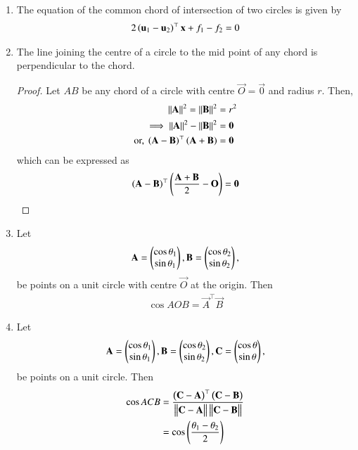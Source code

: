 \begin{enumerate}[label=\thesubsection.\arabic*.,ref=\thesubsection.\theenumi]
\item The equation of the common chord of intersection of two  circles is given by 
\begin{align}
	2\left(\mathbf{u}_1
	   -\mathbf{u}_2\right)^{\top}\mathbf{x} + f_1 - f_2 = 0
	\label{eq:circ-chord}
\end{align}
\item The line joining the centre of a circle to the mid point of any chord is perpendicular to the chord.
	\label{prop:circ-chord-perp}
	\begin{proof}
	Let $AB$ be any chord of a circle with centre $\vec{O}= \vec{0}$ and radius $r$.  Then, 
\begin{align}
	\left\lVert\mathbf{A}\right\rVert^2 
	=\left\lVert\mathbf{B}\right\rVert^2  &= r^2
	\\
	\implies 
	\left\lVert\mathbf{A}\right\rVert^2 
	-\left\lVert\mathbf{B}\right\rVert^2  &=\mathbf{0}
	\\
	\text{or, }\left(\mathbf{A}-\mathbf{B}\right)^{\top}\left(\mathbf{A}+\mathbf{B}\right) &= \mathbf{0}
\end{align}
which can be expressed as 
\begin{align}
	\left(\mathbf{A}-\mathbf{B}\right)^{\top}\left(\frac{\mathbf{A}+\mathbf{B}}{2}-\mathbf{O}\right) = \mathbf{0}
\end{align}
	\end{proof}
\item Let 
\begin{align}
\mathbf{A} =  \begin{pmatrix}\cos \theta_1 \\ \sin \theta_1\end{pmatrix},
\mathbf{B} =  \begin{pmatrix}\cos \theta_2 \\ \sin \theta_2\end{pmatrix},
\end{align}
 be points on  a unit circle with centre $\vec{O}$ at the origin.  Then
\begin{align}
	\label{eq:circ-ang-centre}
	\cos AOB = \vec{A}^{\top}\vec{B} 
\end{align}
\item Let 
\begin{align}
\mathbf{A} =  \begin{pmatrix}\cos \theta_1 \\ \sin \theta_1\end{pmatrix},
\mathbf{B} =  \begin{pmatrix}\cos \theta_2 \\ \sin \theta_2\end{pmatrix},
\mathbf{C} =  \begin{pmatrix}\cos \theta \\ \sin \theta\end{pmatrix},
\end{align}
 be points on  a unit circle.  Then
  \begin{align}
	\label{eq:circ-angle-1}
	  \cos ACB&= \frac{\brak{\vec{C}-\vec{A}}^{\top} \brak{\vec{C}-\vec{B}}}{\norm{\vec{C}-\vec{A}}\norm{\vec{C}-\vec{B}}}
	  \\
	  &= \cos \brak{\frac{\theta_1 - \theta_2}{2}}

\end{align}
\end{enumerate}
